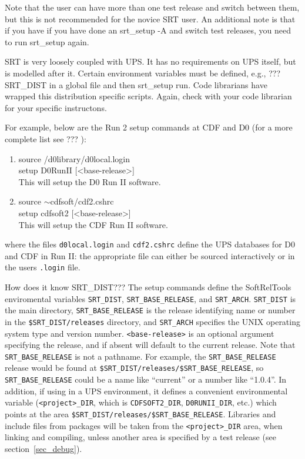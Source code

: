 \documentclass[12pt]{article}
\begin{document}
Note that the user can have more than one test release and switch between 
them, but this is not recommended for the novice SRT user. An additional note
is that if you have if you have done an srt\_setup -A and switch test 
releases, you need to run srt\_setup again. 

SRT is very loosely coupled with UPS. It has no requirements on UPS itself,
but is modelled after it. Certain environment variables must be defined, 
e.g., ??? SRT\_DIST in a global file and then srt\_setup run. Code librarians
have wrapped this distribution specific scripts. 
Again, check with your code librarian for your specific instructons. 

For example, below are
the Run 2 setup commands at CDF and D0 (for a more complete list see ???
):
\begin{enumerate}
\item {\ttfamily source /d0library/d0local.login }\\
{\ttfamily setup D0RunII [<base-release>]}\\
This will setup the D0 Run II software.  
\item {\ttfamily source $\sim$cdfsoft/cdf2.cshrc}\\
{\ttfamily setup cdfsoft2 [<base-release>]}\\
This will setup the CDF Run II software. \\
\end{enumerate}

where the files \texttt{d0local.login} and 
\texttt{cdf2.cshrc} define the UPS databases for D0 and CDF in Run II:
the appropriate file can either be sourced 
interactively or in the users \texttt{.login} file.  


How does it know SRT\_DIST???
The setup commands define the  SoftRelTools enviromental variables 
\texttt{SRT\_DIST}, \texttt{SRT\_BASE\_RELEASE}, and \texttt{SRT\_ARCH}. 
\texttt{SRT\_DIST} is the
main directory, \texttt{SRT\_BASE\_RELEASE} is the release 
identifying name
or number in the \texttt{\$SRT\_DIST/releases} directory, and \texttt{SRT\_ARCH} 
specifies the UNIX operating system type and version number.
\texttt{<base-release>} is an optional
argument specifying the release, and if absent will default to the current
release. Note that \texttt{SRT\_BASE\_RELEASE} is not
a pathname.  For example, the \texttt{SRT\_BASE\_RELEASE} release would be found at
\texttt{\$SRT\_DIST/releases/\$SRT\_BASE\_RELEASE}, so \texttt{SRT\_BASE\_RELEASE} could be a name 
like ``current'' or
a number like ``1.0.4''.  In addition, if using in a UPS environment, it 
defines a convenient 
environmental variable (\texttt{<project>\_DIR}, which is 
\texttt{CDFSOFT2\_DIR}, \texttt{D0RUNII\_DIR}, etc.) which 
points at the area \texttt{\$SRT\_DIST/releases/\$SRT\_BASE\_RELEASE}. 
Libraries and include 
files from packages will be taken from the \texttt{<project>\_DIR} area, 
when linking and compiling, unless another area is specified 
by a test release (see section~\ref{sec_debug}). 
\end{document}

